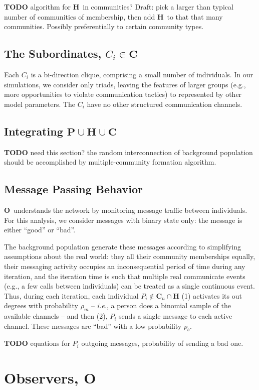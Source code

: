 \documentclass{article}
\newcommand{\Hub}[0]{\ensuremath{\mathbf{H}}}
\newcommand{\C}[1]{\ensuremath{\mathbf{C}_{#1}}}
\newcommand{\Obs}[0]{\ensuremath{\mathbf{O}}}
\begin{document}
{\bf TODO} algorithm for \Hub\ in communities?  Draft: pick a larger than typical number of communities of membership, then add \Hub\ to that that many communities.  Possibly preferentially to certain community types.

\subsection*{The Subordinates, $C_i\in\mathbf{C}$}
Each $C_i$ is a bi-direction clique, comprising a small number of individuals.  In our simulations, we consider only triads, leaving the features of larger groups (e.g., more opportunities to violate communication tactics) to represented by other model parameters.  The $C_i$ have no other structured communication channels.

\subsection*{Integrating $\mathbf{P}\cup\Hub\cup\mathbf{C}$}
{\bf TODO} need this section?  the random interconnection of background population should be accomplished by multiple-community formation algorithm.

\subsection*{Message Passing Behavior}
\Obs\ understands the network by monitoring message traffic between individuals.  For this analysis, we consider messages with binary state only: the message is either ``good'' or ``bad''.

The background population generate these messages according to simplifying assumptions about the real world: they all their community memberships equally, their messaging activity occupies an inconsequential period of time during any iteration, and the iteration time is such that multiple real communicate events (e.g., a few calls between individuals) can be treated as a single continuous event.  Thus, during each iteration, each individual $P_i\notin\C{n}\cap\Hub$ (1) activates its out degrees with probability $\rho_m$ -- {\em i.e.}, a person does a binomial sample of the available channels -- and then (2), $P_i$ sends a single message to each active channel.  These messages are ``bad'' with a low probability $p_b$.

{\bf TODO} equations for $P_i$ outgoing messages, probability of sending a bad one.

\section*{Observers, \Obs}
\end{document}
